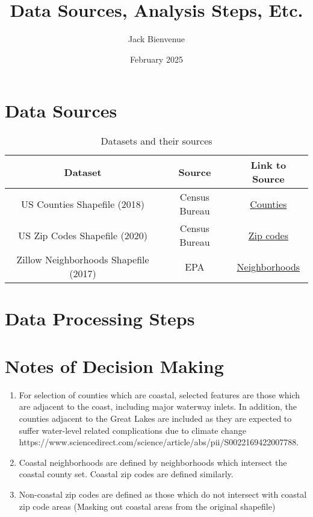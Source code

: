 \documentclass{article}
\title{Data Sources, Analysis Steps, Etc.}
\author{Jack Bienvenue}
\date{February 2025}
\begin{document}
\maketitle

\section{Data Sources}

\begin{table}[h!]
\centering
\begin{tabular}{|c|c|c|}
\hline
\textbf{Dataset} & \textbf{Source} & \textbf{Link to Source} \\
\hline
US Counties Shapefile (2018) & Census Bureau & \href{census.gov/geographies/mapping-files/time-series/geo/carto-boundary-file.html}{Counties} \\
US Zip Codes Shapefile (2020) & Census Bureau & \href{census.gov/cgi-bin/geo/shapefiles/index.php?year=2020&layergroup=ZIP+Code+Tabulation+Areas}{Zip codes} \\
Zillow Neighborhoods Shapefile (2017) & EPA & \href{catalog.data.gov/dataset/neighborhoods-us-2017-zillow-segs9}{Neighborhoods} \\
\hline
\end{tabular}
\caption{Datasets and their sources}
\end{table}

\section{Data Processing Steps}

\section{Notes of Decision Making}

\begin{enumerate}
    \item For selection of counties which are coastal, selected features are those which are adjacent to the coast, including major waterway inlets. In addition, the counties adjacent to the Great Lakes are included as they are expected to suffer water-level related complications due to climate change https://www.sciencedirect.com/science/article/abs/pii/S0022169422007788.
    \item Coastal neighborhoods are defined by neighborhoods which intersect the coastal county set. Coastal zip codes are defined similarly.
    \item Non-coastal zip codes are defined as those which do not intersect with coastal zip code areas (Masking out coastal areas from the original shapefile)
\end{enumerate}
\end{document}
